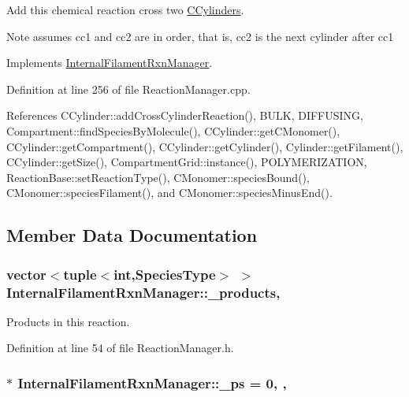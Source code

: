 Add this chemical reaction cross two \hyperlink{classCCylinder}{C\+Cylinders}. 

\begin{DoxyNote}{Note}
assumes cc1 and cc2 are in order, that is, cc2 is the next cylinder after cc1 
\end{DoxyNote}


Implements \hyperlink{classInternalFilamentRxnManager_ac8152bcd9f6aa5d69f85a98cff86d2b0}{Internal\+Filament\+Rxn\+Manager}.



Definition at line 256 of file Reaction\+Manager.\+cpp.



References C\+Cylinder\+::add\+Cross\+Cylinder\+Reaction(), B\+U\+L\+K, D\+I\+F\+F\+U\+S\+I\+N\+G, Compartment\+::find\+Species\+By\+Molecule(), C\+Cylinder\+::get\+C\+Monomer(), C\+Cylinder\+::get\+Compartment(), C\+Cylinder\+::get\+Cylinder(), Cylinder\+::get\+Filament(), C\+Cylinder\+::get\+Size(), Compartment\+Grid\+::instance(), P\+O\+L\+Y\+M\+E\+R\+I\+Z\+A\+T\+I\+O\+N, Reaction\+Base\+::set\+Reaction\+Type(), C\+Monomer\+::species\+Bound(), C\+Monomer\+::species\+Filament(), and C\+Monomer\+::species\+Minus\+End().



\subsection{Member Data Documentation}
\hypertarget{classInternalFilamentRxnManager_afd213da1a3706e2e88962e5da886a5dc}{
\subsubsection[{\+\_\+products}]{\setlength{\rightskip}{0pt plus 5cm}vector$<$tuple$<$int,{\bf Species\+Type}$>$ $>$ Internal\+Filament\+Rxn\+Manager\+::\+\_\+products\hspace{0.3cm}{\ttfamily [protected]}, {\ttfamily [inherited]}}}\label{classInternalFilamentRxnManager_afd213da1a3706e2e88962e5da886a5dc}


Products in this reaction. 



Definition at line 54 of file Reaction\+Manager.\+h.

\hypertarget{classInternalFilamentRxnManager_a973ce9cc2aae811e6867afa46193c5f2}{
\subsubsection[{\+\_\+ps}]{ $\ast$ Internal\+Filament\+Rxn\+Manager\+::\+\_\+ps = 0\hspace{0.3cm}{\ttfamily [static]}, {\ttfamily [protected]}, {\ttfamily [inherited]}}}\label{classInternalFilamentRxnManager_a973ce9cc2aae811e6867afa46193c5f2}


